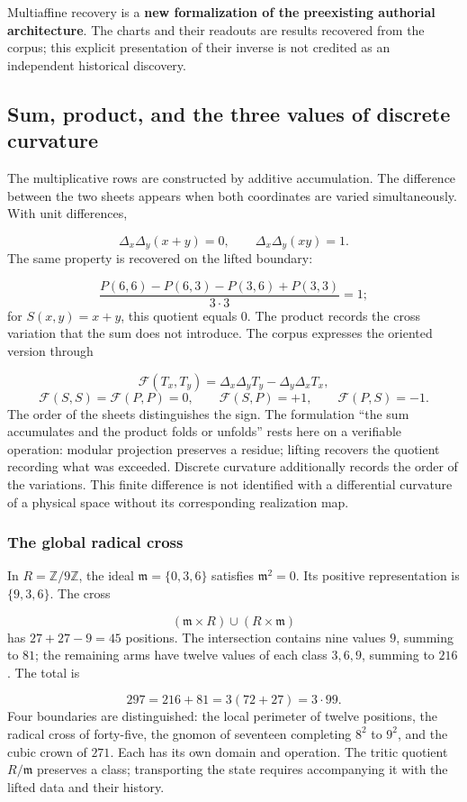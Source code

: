 Multiaffine recovery is a \textbf{new formalization of the preexisting authorial architecture}. The charts and their readouts are results recovered from the corpus; this explicit presentation of their inverse is not credited as an independent historical discovery.

\subsection{Sum, product, and the three values of discrete curvature}
The multiplicative rows are constructed by additive accumulation. The difference between the two sheets appears when both coordinates are varied simultaneously. With unit differences,

\[
\Delta_x\Delta_y(x+y)=0,
\qquad
\Delta_x\Delta_y(xy)=1.
\]
The same property is recovered on the lifted boundary:

\[
\frac{P(6,6)-P(6,3)-P(3,6)+P(3,3)}{3\cdot3}=1;
\]
for \(S(x,y)=x+y\), this quotient equals \(0\). The product records the cross variation that the sum does not introduce. The corpus expresses the oriented version through

\[
\mathcal F(T_x,T_y)=\Delta_x\Delta_yT_y-\Delta_y\Delta_xT_x,
\]
\[
\mathcal F(S,S)=\mathcal F(P,P)=0,
\qquad \mathcal F(S,P)=+1,
\qquad \mathcal F(P,S)=-1.
\]
The order of the sheets distinguishes the sign. The formulation “the sum accumulates and the product folds or unfolds” rests here on a verifiable operation: modular projection preserves a residue; lifting recovers the quotient recording what was exceeded. Discrete curvature additionally records the order of the variations. This finite difference is not identified with a differential curvature of a physical space without its corresponding realization map.

\subsubsection*{The global radical cross}
In \(R=\mathbb Z/9\mathbb Z\), the ideal \(\mathfrak m=\{0,3,6\}\) satisfies \(\mathfrak m^2=0\). Its positive representation is \(\{9,3,6\}\). The cross

\[
(\mathfrak m\times R)\cup(R\times\mathfrak m)
\]
has \(27+27-9=45\) positions. The intersection contains nine values \(9\), summing to \(81\); the remaining arms have twelve values of each class \(3,6,9\), summing to \(216\). The total is

\[
297=216+81=3(72+27)=3\cdot99.
\]
Four boundaries are distinguished: the local perimeter of twelve positions, the radical cross of forty-five, the gnomon of seventeen completing \(8^2\) to \(9^2\), and the cubic crown of \(271\). Each has its own domain and operation. The tritic quotient \(R/\mathfrak m\) preserves a class; transporting the state requires accompanying it with the lifted data and their history.

